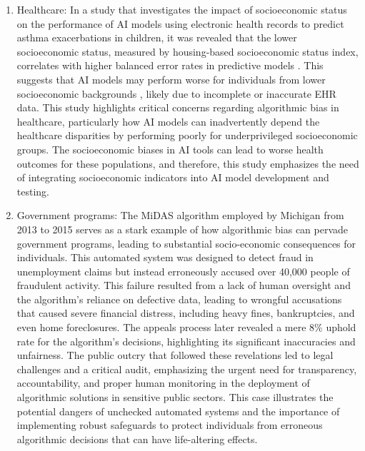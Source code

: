 \documentclass[10pt]{article}
\begin{document}
  \begin{enumerate}
    \item Healthcare: In a study that investigates the impact of socioeconomic status on the performance of AI models using electronic health records to predict asthma exacerbations in children, it was revealed that the lower socioeconomic status, measured by housing-based socioeconomic status index, correlates with higher balanced error rates in predictive models \cite{juhn2022assessing}. This suggests that AI models may perform worse for individuals from lower socioeconomic backgrounds , likely due to incomplete or inaccurate EHR data. This study highlights critical concerns regarding algorithmic bias in healthcare, particularly how AI models can inadvertently depend the healthcare disparities by performing poorly for underprivileged socioeconomic groups. The socioeconomic biases in AI tools can lead to worse health outcomes for these populations, and therefore, this study emphasizes the need of integrating socioeconomic indicators into AI model development and testing. 
    \item Government programs: The MiDAS algorithm employed by Michigan from 2013 to 2015 serves as a stark example of how algorithmic bias can pervade government programs, leading to substantial socio-economic consequences for individuals. This automated system was designed to detect fraud in unemployment claims but instead erroneously accused over 40,000 people of fraudulent activity. This failure resulted from a lack of human oversight and the algorithm’s reliance on defective data, leading to wrongful accusations that caused severe financial distress, including heavy fines, bankruptcies, and even home foreclosures. The appeals process later revealed a mere 8\% uphold rate for the algorithm’s decisions, highlighting its significant inaccuracies and unfairness. The public outcry that followed these revelations led to legal challenges and a critical audit, emphasizing the urgent need for transparency, accountability, and proper human monitoring in the deployment of algorithmic solutions in sensitive public sectors. This case illustrates the potential dangers of unchecked automated systems and the importance of implementing robust safeguards to protect individuals from erroneous algorithmic decisions that can have life-altering effects.

\end{enumerate}
\end{document}
